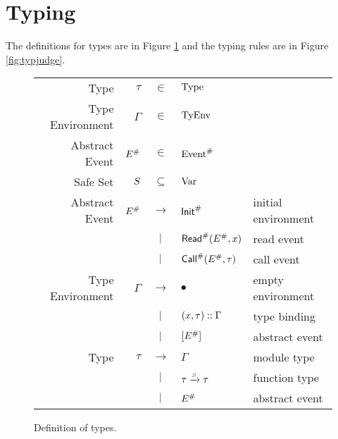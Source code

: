 \section{Typing}
The definitions for types are in Figure \ref{fig:typdom} and the typing rules are in Figure \ref{fig:typjudge}.

\begin{figure}[h!]
  \centering
  \begin{tabular}{rrcll}
    Type             & $\tau$       & $\in$         & $\text{Type}$                                             \\
    Type Environment & $\Gamma$     & $\in$         & $\text{TyEnv}$                                            \\
    Abstract Event   & ${E}^{\#}$ & $\in$         & ${\text{Event}}^{\#}$                                        \\
    Safe Set         & $S$      & $\subseteq$   & $\text{Var}$                                          \\
    Abstract Event   & ${E}^{\#}$ & $\rightarrow$ & ${\textsf{Init}}^{\#}$                  & initial environment \\
                     &              & $|$       & ${\textsf{Read}}^{\#}({E}^{\#},x)$    & read event          \\
                     &              & $|$       & ${\textsf{Call}}^{\#}({E}^{\#},\tau)$ & call event          \\
    Type Environment & $\Gamma$     & $\rightarrow$ & $\bullet$                     & empty environment   \\
                     &              & $|$       & $(x,\tau):: \Gamma$        & type binding        \\
                     &              & $|$       & $[{E}^{\#}]$                & abstract event      \\
    Type             & $\tau$       & $\rightarrow$ & $\Gamma$                      & module type         \\
                     &              & $|$       & ${\tau}\xrightarrow{\mbox{\tiny$S$}}{\tau}$ & function type       \\
                     &              & $|$       & ${E}^{\#}$                  & abstract event
  \end{tabular}
  \caption{Definition of types.}
  \label{fig:typdom}
\end{figure}

